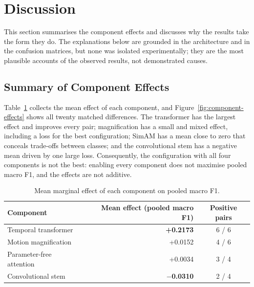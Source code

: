 \section{Discussion}
\label{sec:discussion}
\label{sec:summary-limitations}

This section summarises the component effects and discusses why the results take the form they do. The explanations below are grounded in the architecture and in the confusion matrices, but none was isolated experimentally; they are the most plausible accounts of the observed results, not demonstrated causes.

\subsection{Summary of Component Effects}
\label{sec:four-findings}
\label{sec:headline-tension}

Table~\ref{tab:component-effects} collects the mean effect of each component, and Figure~\ref{fig:component-effects} shows all twenty matched differences. The transformer has the largest effect and improves every pair; magnification has a small and mixed effect, including a loss for the best configuration; SimAM has a mean close to zero that conceals trade-offs between classes; and the convolutional stem has a negative mean driven by one large loss. Consequently, the configuration with all four components is not the best: enabling every component does not maximise pooled macro F1, and the effects are not additive.

\begin{table}[htbp]
	\centering
	\begin{tabular}{l r c}
		\hline
		\textbf{Component} & \textbf{Mean effect (pooled macro F1)} & \textbf{Positive pairs} \\
		\hline
		Temporal transformer      & \textbf{+0.2173}   & 6 / 6 \\
		Motion magnification      & +0.0152            & 4 / 6 \\
		Parameter-free attention  & +0.0034            & 3 / 4 \\
		Convolutional stem        & \textbf{$-$0.0310} & 2 / 4 \\
		\hline
	\end{tabular}
	\caption[Mean marginal effect of each component on pooled macro F1]{Mean marginal effect of each component on pooled macro F1.}
	\label{tab:component-effects}
\end{table}

